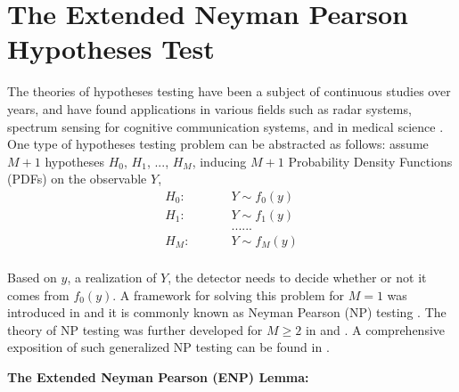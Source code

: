 \section{The Extended Neyman Pearson Hypotheses Test}
The theories of hypotheses testing have been a subject of continuous studies over years, and have found applications in various fields such as radar systems, spectrum sensing for cognitive communication systems, and in  medical science \cite{ma2008soft, srinivasan1986distributed, spielman1973refutation}. One type of hypotheses testing problem can be abstracted as  follows: assume $M+1$  hypotheses $H_0$, $H_1$, ..., $H_{M}$, inducing $M+1$  Probability Density Functions (PDFs) on the observable $Y$,
\begin{equation}
\label{equ:hypothesis}
\begin{split}
H_0:\;\;\;\;\;\;\;\;\;&Y \sim f_0(y) \\
H_1:\;\;\;\;\;\;\;\;\;&Y \sim f_1(y)\\
&......\\
H_M:\;\;\;\;\;\;\;\;\;&Y \sim f_M(y)\\
\end{split}
\end{equation}

Based on $y$, a realization of $Y$, the detector needs to decide whether or not it comes from $f_0(y)$. A framework for solving this problem for $M=1$ was introduced in \cite{neyman1933problem} and it is commonly known as Neyman Pearson (NP) testing \cite{neyman1933problem}. The theory of NP testing was further developed for $M \geq 2$ in \cite{wald1939contributions} and \cite{dantzig1951fundamental}.  A comprehensive exposition of such generalized NP testing can be found in \cite{LehmannTest}.

\noindent  \textbf{The Extended Neyman Pearson (ENP) Lemma:}

